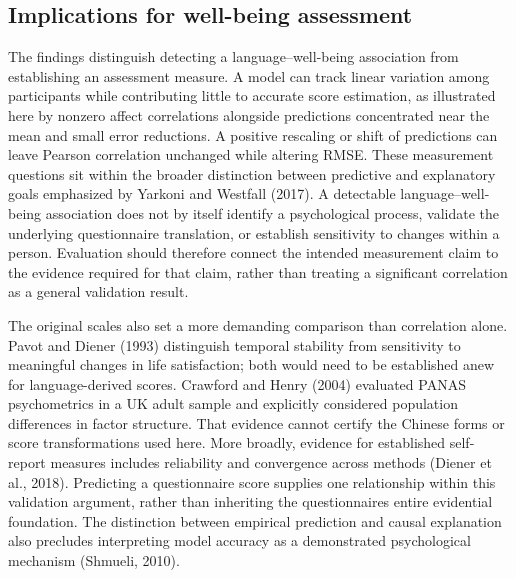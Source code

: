 \documentclass[11pt,letterpaper]{article}
\begin{document}
\subsection{Implications for well-being assessment}\label{implications-for-well-being-assessment}

The findings distinguish detecting a language--well-being association from establishing an assessment measure. A model can track linear variation among participants while contributing little to accurate score estimation, as illustrated here by nonzero affect correlations alongside predictions concentrated near the mean and small error reductions. A positive rescaling or shift of predictions can leave Pearson correlation unchanged while altering RMSE. These measurement questions sit within the broader distinction between predictive and explanatory goals emphasized by Yarkoni and Westfall (2017). A detectable language--well-being association does not by itself identify a psychological process, validate the underlying questionnaire translation, or establish sensitivity to changes within a person. Evaluation should therefore connect the intended measurement claim to the evidence required for that claim, rather than treating a significant correlation as a general validation result.

The original scales also set a more demanding comparison than correlation alone. Pavot and Diener (1993) distinguish temporal stability from sensitivity to meaningful changes in life satisfaction; both would need to be established anew for language-derived scores. Crawford and Henry (2004) evaluated PANAS psychometrics in a UK adult sample and explicitly considered population differences in factor structure. That evidence cannot certify the Chinese forms or score transformations used here. More broadly, evidence for established self-report measures includes reliability and convergence across methods (Diener et al., 2018). Predicting a questionnaire score supplies one relationship within this validation argument, rather than inheriting the questionnaire\textquotesingle s entire evidential foundation. The distinction between empirical prediction and causal explanation also precludes interpreting model accuracy as a demonstrated psychological mechanism (Shmueli, 2010).
\end{document}
